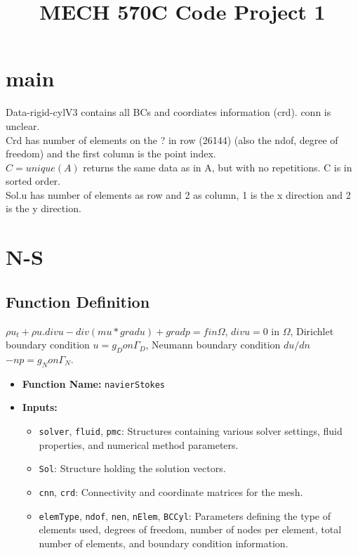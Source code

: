\documentclass[a4paper,12pt]{article} %
\begin{document}
\title{MECH 570C Code Project 1}
\maketitle


\section{main}
Data-rigid-cylV3 contains all BCs and coordiates information (crd). conn is unclear. \\
Crd has number of elements on the ? in row (26144) (also the ndof, degree of freedom) 
and the first column is the point index.\\
$C = unique(A)$ returns the same data as in A, but with no repetitions. C is in sorted order.\\
Sol.u has number of elements as row and 2 as column, 1 is the x direction and 2 is the y direction.\\



\section{N-S}
\subsection*{Function Definition}

$\rho u_t + \rho u.div u - div(mu*grad u) + grad p = f in \Omega$,    
$div u = 0$  in $\Omega$,                           
Dirichlet boundary condition        $u = g_D  on \Gamma_D$,         
Neumann boundary condition $du/dn$ $- np = g_N  on \Gamma_N$. 

\begin{itemize}
    \item \textbf{Function Name:} \texttt{navierStokes}
    \item \textbf{Inputs:} 
    \begin{itemize}
        \item \texttt{solver}, \texttt{fluid}, \texttt{pmc}: Structures containing various solver settings, fluid properties, and numerical method parameters.
        \item \texttt{Sol}: Structure holding the solution vectors.
        \item \texttt{cnn}, \texttt{crd}: Connectivity and coordinate matrices for the mesh.
        \item \texttt{elemType}, \texttt{ndof}, \texttt{nen}, \texttt{nElem}, \texttt{BCCyl}: Parameters defining the type of elements used, degrees of freedom, number of nodes per element, total number of elements, and boundary condition information.
    \end{itemize}
\end{itemize}
\end{document}
